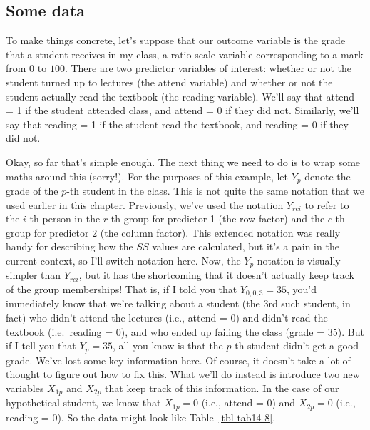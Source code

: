 \documentclass[
  a4paper,
]{book}
\begin{document}
\hypertarget{some-data}{%
\subsection{Some data}\label{some-data}}

To make things concrete, let's suppose that our outcome variable is the
grade that a student receives in my class, a ratio-scale variable
corresponding to a mark from \(0%
\) to \(100%
\). There are two predictor variables of interest: whether or not the
student turned up to lectures (the attend variable) and whether or not
the student actually read the textbook (the reading variable). We'll say
that attend = 1 if the student attended class, and attend = 0 if they
did not. Similarly, we'll say that reading = 1 if the student read the
textbook, and reading = 0 if they did not.

Okay, so far that's simple enough. The next thing we need to do is to
wrap some maths around this (sorry!). For the purposes of this example,
let \(Y_p\) denote the grade of the \(p\)-th student in the class. This
is not quite the same notation that we used earlier in this chapter.
Previously, we've used the notation \(Y_{rci}\) to refer to the \(i\)-th
person in the \(r\)-th group for predictor 1 (the row factor) and the
\(c\)-th group for predictor 2 (the column factor). This extended
notation was really handy for describing how the \(SS\) values are
calculated, but it's a pain in the current context, so I'll switch
notation here. Now, the \(Y_p\) notation is visually simpler than
\(Y_{rci}\), but it has the shortcoming that it doesn't actually keep
track of the group memberships! That is, if I told you that
\(Y_{0,0,3} = 35\), you'd immediately know that we're talking about a
student (the 3rd such student, in fact) who didn't attend the lectures
(i.e., attend = 0) and didn't read the textbook (i.e.~reading = 0), and
who ended up failing the class (grade = 35). But if I tell you that
\(Y_p = 35\), all you know is that the \(p\)-th student didn't get a
good grade. We've lost some key information here. Of course, it doesn't
take a lot of thought to figure out how to fix this. What we'll do
instead is introduce two new variables \(X_{1p}\) and \(X_{2p}\) that
keep track of this information. In the case of our hypothetical student,
we know that \(X_{1p} = 0\) (i.e., attend = 0) and \(X_{2p} = 0\) (i.e.,
reading = 0). So the data might look like Table~\ref{tbl-tab14-8}.

\hypertarget{tbl-tab14-8}{}
 
  \providecommand{\huxb}[2]{\arrayrulecolor[RGB]{#1}\global\arrayrulewidth=#2pt}
  \providecommand{\huxvb}[2]{\color[RGB]{#1}\vrule width #2pt}
  \providecommand{\huxtpad}[1]{\rule{0pt}{#1}}
  \providecommand{\huxbpad}[1]{\rule[-#1]{0pt}{#1}}
\end{document}
